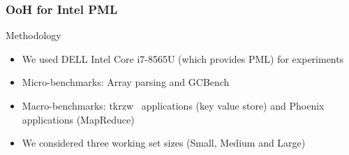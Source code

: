 \documentclass[xcolor=table,bigger,unknownkeysallowed]{beamer}
\begin{document}
        \begin{frame}
                \frametitle{OoH for Intel PML}			
			\begin{block}{Methodology}
				\begin{itemize}
					\item We used DELL Intel Core i7-8565U (which provides PML) for experiments				
					\item Micro-benchmarks: Array parsing and GCBench
					\item Macro-benchmarks: tkrzw~\cite{tkrzw} applications (key value store) and Phoenix applications (MapReduce)
					\item We considered three working set sizes (Small, Medium and Large)
				\end{itemize}
			\end{block} 
%

\end{frame}
\end{document}
